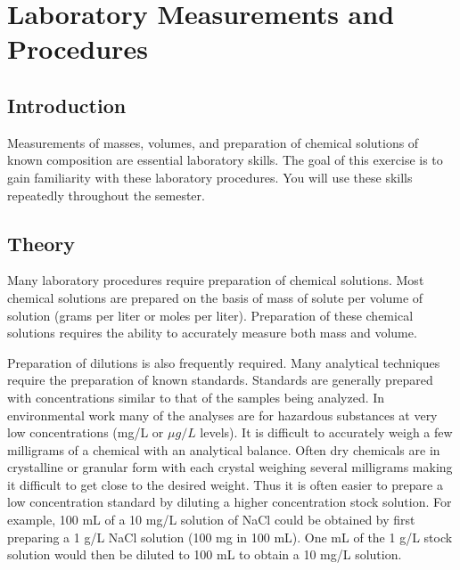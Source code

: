 \documentclass[letterpaper,10pt,english]{sphinxmanual}
\begin{document}
\chapter{Laboratory Measurements and Procedures}
\label{\detokenize{Laboratory_Measurements/Laboratory_Measurements:laboratory-measurements-and-procedures}}\label{\detokenize{Laboratory_Measurements/Laboratory_Measurements:title-laboratory-measurements-and-procedures}}\label{\detokenize{Laboratory_Measurements/Laboratory_Measurements::doc}}

\section{Introduction}
\label{\detokenize{Laboratory_Measurements/Laboratory_Measurements:introduction}}\label{\detokenize{Laboratory_Measurements/Laboratory_Measurements:heading-laboratory-measurements-and-procedures-introduction}}
Measurements of masses, volumes, and preparation of chemical solutions of known composition are essential laboratory skills. The goal of this exercise is to gain familiarity with these laboratory procedures. You will use these skills repeatedly throughout the semester.


\section{Theory}
\label{\detokenize{Laboratory_Measurements/Laboratory_Measurements:theory}}\label{\detokenize{Laboratory_Measurements/Laboratory_Measurements:heading-laboratory-measurements-and-procedures-theory}}
Many laboratory procedures require preparation of chemical solutions. Most chemical solutions are prepared on the basis of mass of solute per volume of solution (grams per liter or moles per liter). Preparation of these chemical solutions requires the ability to accurately measure both mass and volume.

Preparation of dilutions is also frequently required. Many analytical techniques require the preparation of known standards. Standards are generally prepared with concentrations similar to that of the samples being analyzed. In environmental work many of the analyses are for hazardous substances at very low concentrations (mg/L or \(\mu g/L\) levels). It is difficult to accurately weigh a few milligrams of a chemical with an analytical balance. Often dry chemicals are in crystalline or granular form with each crystal weighing several milligrams making it difficult to get close to the desired weight. Thus it is often easier to prepare a low concentration standard by diluting a higher concentration stock solution. For example, 100 mL of a 10 mg/L solution of NaCl could be obtained by first preparing a 1 g/L NaCl solution (100 mg in 100 mL). One mL of the 1 g/L stock solution would then be diluted to 100 mL to obtain a 10 mg/L solution.
\end{document}
